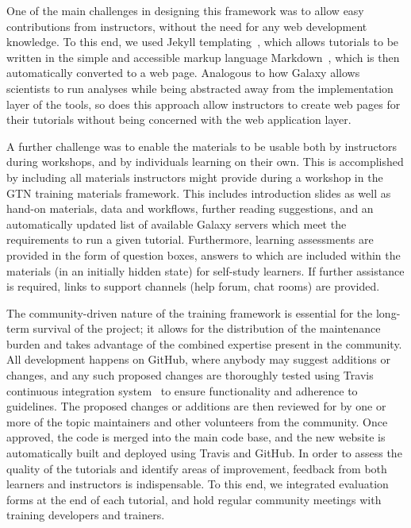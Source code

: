 One of the main challenges in designing this framework was to allow easy contributions from instructors, without the need for any web development knowledge. To this end, we used Jekyll templating~\cite{url-jekyll}, which allows tutorials to be written in the simple and accessible markup language Markdown~\cite{url-markdown}, which is then automatically converted to a web page. Analogous to how Galaxy allows scientists to run analyses while being abstracted away from the implementation layer of the tools, so does this approach allow instructors to create web pages for their tutorials without being concerned with the web application layer.

A further challenge was to enable the materials to be usable both by instructors during workshops, and by individuals learning on their own. This is accomplished by including all materials instructors might provide during a workshop in the GTN training materials framework. This includes introduction slides as well as hand-on materials, data and workflows, further reading suggestions, and an automatically updated list of available Galaxy servers which meet the requirements to run a given tutorial. Furthermore, learning assessments are provided in the form of question boxes, answers to which are included within the materials (in an initially hidden state) for self-study learners. If further assistance is required, links to support channels (help forum, chat rooms) are provided.

The community-driven nature of the training framework is essential for the long-term survival of the project; it allows for the distribution of the maintenance burden and takes advantage of the combined expertise present in the community. All development happens on GitHub, where anybody may suggest additions or changes, and any such proposed changes are thoroughly tested using Travis continuous integration system~\cite{travis-ci} to ensure functionality and adherence to guidelines. The proposed changes or additions are then reviewed for by one or more of the topic maintainers and other volunteers from the community. Once approved, the code is merged into the main code base, and the new website is automatically built and deployed using Travis and GitHub. In order to assess the quality of the tutorials and identify areas of improvement, feedback from both learners and instructors is indispensable. To this end, we integrated evaluation forms at the end of each tutorial, and hold regular community meetings with training developers and trainers.

